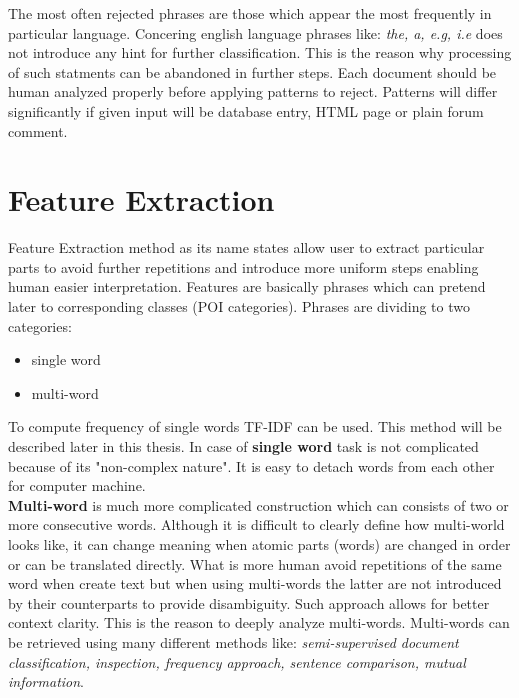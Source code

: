 The most often rejected phrases are those which appear the most frequently in particular language. Concering english language phrases like: \textit{the, a, e.g, i.e} does not introduce any hint for further classification. This is the reason why processing of such statments can be abandoned in further steps. Each document should be human analyzed properly before applying patterns to reject. Patterns will differ significantly if given input will be database entry, HTML page or plain forum comment.

\section{Feature Extraction}

Feature Extraction method as its name states allow user to extract particular parts to avoid further repetitions and introduce more uniform steps enabling human easier interpretation. Features are basically phrases which can pretend later to corresponding classes (POI categories). Phrases are dividing to two categories:
\begin{itemize}
	\item single word
	\item multi-word
\end{itemize}
To compute frequency of single words TF-IDF\cite{2}\cite{3} can be used. This method will be described later in this thesis. In case of \textbf{single word} task is not complicated because of its "non-complex nature". It is easy to detach words from each other for computer machine.
\\ \newline\textbf{Multi-word} is much more complicated construction which can consists of two or more consecutive words. Although it is difficult to clearly define how multi-world looks like, it can change meaning when atomic parts (words) are changed in order or can be translated directly. What is more human avoid repetitions of the same word when create text but when using multi-words the latter are not introduced by their counterparts to provide disambiguity. Such approach allows for better context clarity. This is the reason to deeply analyze multi-words. Multi-words can be retrieved using many different methods like: \textit{semi-supervised document classification, inspection, frequency approach, sentence comparison, mutual information}\cite{1}.

